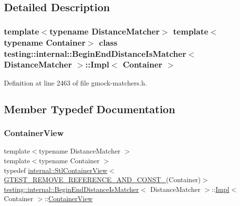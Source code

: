 \subsection{Detailed Description}
\subsubsection*{template$<$typename Distance\+Matcher$>$\newline
template$<$typename Container$>$\newline
class testing\+::internal\+::\+Begin\+End\+Distance\+Is\+Matcher$<$ Distance\+Matcher $>$\+::\+Impl$<$ Container $>$}



Definition at line 2463 of file gmock-\/matchers.\+h.



\subsection{Member Typedef Documentation}
\mbox{\label{classtesting_1_1internal_1_1BeginEndDistanceIsMatcher_1_1Impl_a5c76ede38c6143430f56e02e9024f535}} 
\subsubsection{\texorpdfstring{Container\+View}{ContainerView}}
{\footnotesize\ttfamily template$<$typename Distance\+Matcher $>$ \\
template$<$typename Container $>$ \\
typedef \hyperlink{classtesting_1_1internal_1_1StlContainerView}{internal\+::\+Stl\+Container\+View}$<$ \hyperlink{gtest-internal_8h_a874567b176266188fabfffb8393267ce}{G\+T\+E\+S\+T\+\_\+\+R\+E\+M\+O\+V\+E\+\_\+\+R\+E\+F\+E\+R\+E\+N\+C\+E\+\_\+\+A\+N\+D\+\_\+\+C\+O\+N\+S\+T\+\_\+}(Container)$>$ \hyperlink{classtesting_1_1internal_1_1BeginEndDistanceIsMatcher}{testing\+::internal\+::\+Begin\+End\+Distance\+Is\+Matcher}$<$ Distance\+Matcher $>$\+::\hyperlink{classtesting_1_1internal_1_1BeginEndDistanceIsMatcher_1_1Impl}{Impl}$<$ Container $>$\+::\hyperlink{classtesting_1_1internal_1_1BeginEndDistanceIsMatcher_1_1Impl_a5c76ede38c6143430f56e02e9024f535}{Container\+View}}



